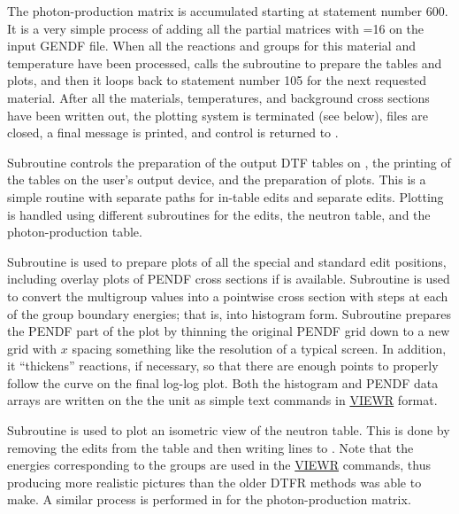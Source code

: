 The photon-production matrix is accumulated starting at statement
number 600.  It is a very simple process of adding all the
partial matrices with =16 on the input GENDF file.
When all the reactions and groups for this material and
temperature have been processed,  calls the
subroutine  to prepare
the tables and plots, and then it loops back to statement number 105
for the next requested material.  After all the materials, temperatures,
and background cross sections have been written out, the plotting
system is terminated (see below), files are closed, a final
message is printed, and control is returned to .

Subroutine 
controls the preparation of the output DTF tables on ,
the printing of the tables on the user's output device, and
the preparation of plots.  This is a simple routine with separate
paths for in-table edits and separate edits.  Plotting is handled
using different subroutines for the edits, the neutron table, and
the photon-production table.

Subroutine  is used to
prepare plots of all the special and standard edit positions,
including overlay plots of PENDF cross sections if 
is available.  Subroutine 
is used to convert the multigroup values into a pointwise
cross section with steps at each of the group boundary energies;
that is, into histogram form.  Subroutine
 prepares the PENDF part
of the plot by thinning the original PENDF grid down to a new grid with
$x$ spacing something like the resolution of a typical screen.
In addition, it ``thickens'' reactions, if necessary, so that
there are enough points to properly follow the curve on the
final log-log plot.  Both the histogram and PENDF data arrays
are written on the the  unit as simple text
commands in \hyperlink{sVIEWRhy}{VIEWR} format.

Subroutine  is used to
plot an isometric view of the neutron table.  This is done by
removing the edits from the table and then writing lines to
.  Note that the energies corresponding to the groups
are used in the \hyperlink{sVIEWRhy}{VIEWR} commands, thus producing
more realistic pictures
than the older DTFR methods was able to make.  A similar process is
performed in  for the
photon-production matrix.


